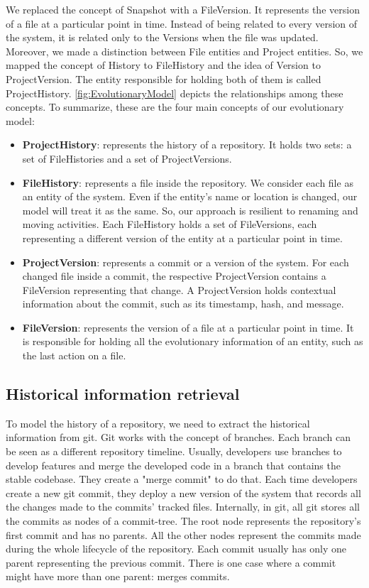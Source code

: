 We replaced the concept of Snapshot with a FileVersion. It represents the version of a file at a particular point in time. Instead of being related to every version of the system, it is related only to the Versions when the file was updated.
Moreover, we made a distinction between File entities and Project entities. So, we mapped the concept of History to FileHistory and the idea of Version to ProjectVersion. 
The entity responsible for holding both of them is called ProjectHistory. \autoref{fig:EvolutionaryModel} depicts the relationships among these concepts. 
To summarize, these are the four main concepts of our evolutionary model: 
\begin{itemize}
    \item \textbf{ProjectHistory}: represents the history of a repository. It holds two sets: a set of FileHistories and a set of ProjectVersions. 
    \item \textbf{FileHistory}: represents a file inside the repository. We consider each file as an entity of the system. Even if the entity's name or location is changed, our model will treat it as the same. So, our approach is resilient to renaming and moving activities. Each FileHistory holds a set of FileVersions, each representing a different version of the entity at a particular point in time.  
    \item \textbf{ProjectVersion}: represents a commit or a version of the system. 
    For each changed file inside a commit, the respective ProjectVersion contains a FileVersion representing that change.
    A ProjectVersion holds contextual information about the commit, such as its timestamp, hash, and message.
    \item \textbf{FileVersion}: represents the version of a file at a particular point in time.
    It is responsible for holding all the evolutionary information of an entity, such as the last action on a file. 
\end{itemize}

\subsection{Historical information retrieval}
To model the history of a repository, we need to extract the historical information from git.
Git works with the concept of branches. Each branch can be seen as a different repository timeline.
Usually, developers use branches to develop features and merge the developed code in a branch that contains the stable codebase.
They create a "merge commit" to do that. 
Each time developers create a new git commit, they deploy a new version of the system that records all the changes made to the commits' tracked files. 
Internally, in git, all git stores all the commits as nodes of a commit-tree. 
The root node represents the repository's first commit and has no parents. 
All the other nodes represent the commits made during the whole lifecycle of the repository. 
Each commit usually has only one parent representing the previous commit.
There is one case where a commit might have more than one parent: merges commits.

